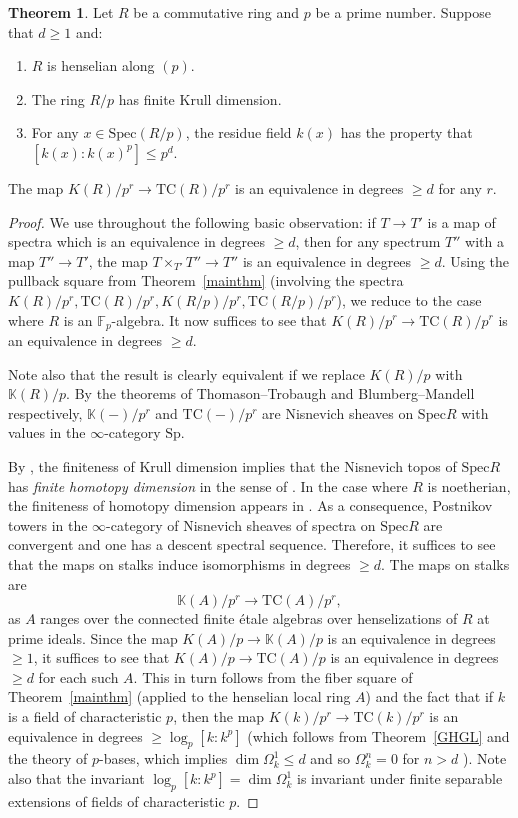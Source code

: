 \documentclass{amsart}
\newcommand{\Sp}{\mathrm{Sp}}
\newcommand{\spec}{\mathrm{Spec}}
\theoremstyle{definition}
\newtheorem{theorem}[definition]{Theorem}
\newcommand{\TC}{\mathrm{TC}}
\begin{document}
\begin{theorem} 
\label{KTCasymptotic}
Let $R$ be a commutative ring and $p$ be a prime number. Suppose that $d
\geq 1$ and:  
\begin{enumerate}
\item  $R$ is henselian along $(p)$. 
\item The ring $R/p$ has finite Krull dimension.  
\item For any $x \in \spec (R/p)$, the residue field $k(x)$ has the property that
$[k(x): k(x)^p] \leq p^d$. \end{enumerate}
The map $K(R)/p^r
\to \TC(R)/p^r$ is an equivalence in degrees $\geq d$ for any $r$. 
\end{theorem} 
\begin{proof} 
We use throughout the following basic observation: if $T \to T'$ is a map of
spectra which is an equivalence in degrees $\geq d$, then for any spectrum $T''$
with a map $T'' \to T'$, the map $T \times_{T'} T'' \to T''$ is an equivalence
in degrees $\geq d$. 
Using the pullback square from Theorem~\ref{mainthm}
(involving the spectra $K(R)/p^r, \TC(R)/p^r, K(R/p)/p^r,
\TC(R/p)/p^r$), we reduce to the case where $R$ is an
$\mathbb{F}_p$-algebra. 
It now suffices to see that $K(R)/p^r \to \TC(R)/p^r$ is an equivalence
in degrees $\geq d$. 


Note also that the result is clearly equivalent if we replace $K(R)/p$ with
$\mathbb{K}(R)/p$. 
By the theorems of Thomason--Trobaugh \cite{TT90} and
Blumberg--Mandell \cite{BMloc} respectively, 
$\mathbb{K}(-)/p^r$ and $\TC(-)/p^r$ 
are Nisnevich sheaves 
on $\spec R$ with 
values in the $\infty$-category $\Sp$. 


By \cite[Th.~3.17]{CM18}, the finiteness of Krull dimension implies that
the Nisnevich topos of $\spec R$ has \emph{finite homotopy dimension}  in the sense of \cite[Def. 7.2.2.1]{HTT}.
In the case where $R$ is noetherian, the finiteness of homotopy dimension
appears in \cite[Thm.~3.7.7.1]{SAG}. 
As a consequence, Postnikov towers in the $\infty$-category of Nisnevich sheaves of
spectra on $\spec R$ are convergent and one has a descent spectral sequence. 
Therefore, it suffices to see that 
the maps on stalks induce isomorphisms in degrees $\geq d$. 
The maps on stalks are 
\[  \mathbb{K}(A)/p^r \to \TC(A)/p^r,  \]
as $A$ ranges over the connected finite \'etale algebras over henselizations of $R$ at prime ideals. 
Since the map $K(A)/p \to \mathbb{K}(A)/p$ is an equivalence in degrees $\geq
1$, 
it suffices to see that $K(A)/p \to \TC(A)/p$ is an 
equivalence in degrees $\geq d$ for each such $A$. This in turn follows from the fiber square 
of Theorem~\ref{mainthm}  (applied to the henselian local ring $A$) 
and the fact that if $k$ is a field of characteristic $p$, then the map $K(k)/p^r
\to \TC(k)/p^r$ is an equivalence in degrees $\geq \log_p [k: k^p]$ (which
follows from Theorem~\ref{GHGL} and the theory of $p$-bases, which implies $\dim
\Omega^1_k \leq d$ and so $\Omega^n_k  = 0$ for $n > d$ \cite[Thm.~26.5]{Matsumura}). 
Note also that the invariant $\log_p [k:k^p] = \dim \Omega^1_k$ is invariant under finite
separable extensions of fields of characteristic $p$. 
\end{proof} 
\end{document}
